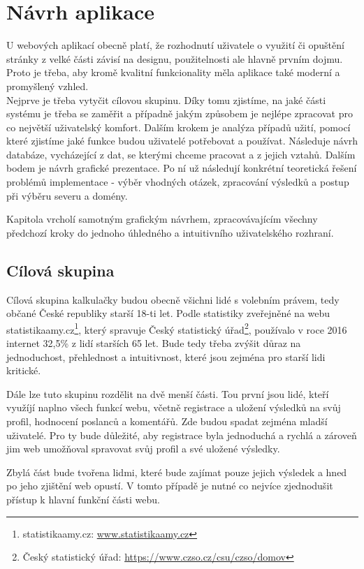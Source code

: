 \chapter{Návrh aplikace}
\label{chap:navrh}
U webových aplikací obecně platí, že rozhodnutí uživatele o využití či opuštění stránky z velké části závisí na designu, použitelnosti ale hlavně prvním dojmu. Proto je třeba, aby kromě kvalitní funkcionality měla aplikace také moderní a promyšlený vzhled. \\
Nejprve je třeba vytyčit cílovou skupinu. Díky tomu zjistíme, na jaké části systému je třeba se zaměřit a případně jakým způsobem je nejlépe zpracovat pro co největší uživatelský komfort. Dalším krokem je analýza případů užití, pomocí které zjistíme jaké funkce budou uživatelé potřebovat a používat. Následuje návrh databáze, vycházející z dat, se kterými chceme pracovat a z jejich vztahů. Dalším bodem je návrh grafické prezentace. Po ní už následují konkrétní teoretická řešení problémů implementace - výběr vhodných otázek, zpracování výsledků a postup při výběru severu a domény.

Kapitola vrcholí samotným grafickým návrhem, zpracovávajícím všechny předchozí kroky do jednoho úhledného a intuitivního uživatelského rozhraní.


\section{Cílová skupina}
Cílová skupina kalkulačky budou obecně všichni lidé s volebním právem, tedy občané České republiky starší 18-ti let.\cite{ustava-volebni_pravo} Podle statistiky zveřejněné na webu statistikaamy.cz\footnote{statistikaamy.cz: \url{www.statistikaamy.cz}}, který spravuje Český statistický úřad\footnote{Český statistický úřad: \url{https://www.czso.cz/csu/czso/domov}}, používalo v roce 2016 internet 32,5\% z lidí starších 65 let\cite{statistikaamy}. Bude tedy třeba zvýšit důraz na jednoduchost, přehlednost a intuitivnost, které jsou zejména pro starší lidi kritické.
\par Dále lze tuto skupinu rozdělit na dvě menší části. Tou první jsou lidé, kteří využíjí naplno všech funkcí webu, včetně registrace a uložení výsledků na svůj profil, hodnocení poslanců a komentářů. Zde budou spadat zejména mladší uživatelé. Pro ty bude důležité, aby registrace byla jednoduchá a rychlá a zároveň jim web umožňoval spravovat svůj profil a své uložené výsledky. 
\par Zbylá část bude tvořena lidmi, které bude zajímat pouze jejich výsledek a hned po jeho zjištění web opustí. V tomto případě je nutné co nejvíce zjednodušit přístup k hlavní funkční části webu.


